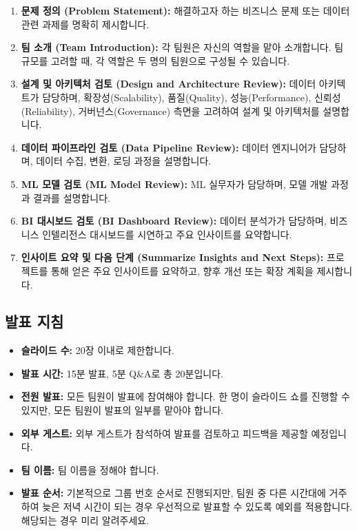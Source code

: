 \documentclass[11pt,a4paper]{article}
\begin{document}
\begin{enumerate}
    \item \textbf{문제 정의 (Problem Statement):} 해결하고자 하는 비즈니스 문제 또는 데이터 관련 과제를 명확히 제시합니다.
    \item \textbf{팀 소개 (Team Introduction):} 각 팀원은 자신의 역할을 맡아 소개합니다. 팀 규모를 고려할 때, 각 역할은 두 명의 팀원으로 구성될 수 있습니다.
    \item \textbf{설계 및 아키텍처 검토 (Design and Architecture Review):} 데이터 아키텍트가 담당하며, 확장성(Scalability), 품질(Quality), 성능(Performance), 신뢰성(Reliability), 거버넌스(Governance) 측면을 고려하여 설계 및 아키텍처를 설명합니다.
    \item \textbf{데이터 파이프라인 검토 (Data Pipeline Review):} 데이터 엔지니어가 담당하며, 데이터 수집, 변환, 로딩 과정을 설명합니다.
    \item \textbf{ML 모델 검토 (ML Model Review):} ML 실무자가 담당하며, 모델 개발 과정과 결과를 설명합니다.
    \item \textbf{BI 대시보드 검토 (BI Dashboard Review):} 데이터 분석가가 담당하며, 비즈니스 인텔리전스 대시보드를 시연하고 주요 인사이트를 요약합니다.
    \item \textbf{인사이트 요약 및 다음 단계 (Summarize Insights and Next Steps):} 프로젝트를 통해 얻은 주요 인사이트를 요약하고, 향후 개선 또는 확장 계획을 제시합니다.
\end{enumerate}

\subsection{발표 지침}
\begin{itemize}
    \item \textbf{슬라이드 수:} 20장 이내로 제한합니다.
    \item \textbf{발표 시간:} 15분 발표, 5분 Q\&A로 총 20분입니다.
    \item \textbf{전원 발표:} 모든 팀원이 발표에 참여해야 합니다. 한 명이 슬라이드 쇼를 진행할 수 있지만, 모든 팀원이 발표의 일부를 맡아야 합니다.
    \item \textbf{외부 게스트:} 외부 게스트가 참석하여 발표를 검토하고 피드백을 제공할 예정입니다.
    \item \textbf{팀 이름:} 팀 이름을 정해야 합니다.
    \item \textbf{발표 순서:} 기본적으로 그룹 번호 순서로 진행되지만, 팀원 중 다른 시간대에 거주하여 늦은 저녁 시간이 되는 경우 우선적으로 발표할 수 있도록 예외를 적용합니다. 해당되는 경우 미리 알려주세요.
\end{itemize}
\end{document}
